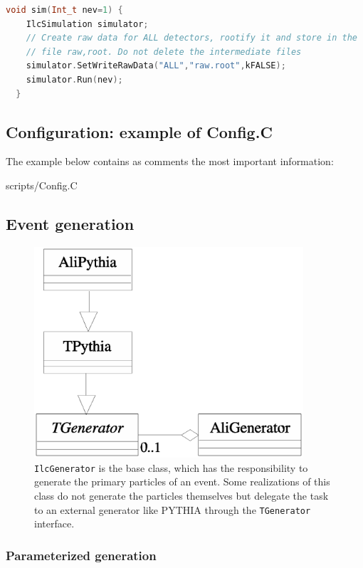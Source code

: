 \documentclass[12pt,a4paper,twoside]{article}
\begin{document}
\begin{lstlisting}[language=C++]
  void sim(Int_t nev=1) {
    IlcSimulation simulator;
    // Create raw data for ALL detectors, rootify it and store in the
    // file raw,root. Do not delete the intermediate files
    simulator.SetWriteRawData("ALL","raw.root",kFALSE);
    simulator.Run(nev);
  }
\end{lstlisting}


\subsection{Configuration: example of Config.C}

The example below contains as comments the most important information:

 {scripts/Config.C}


\subsection{Event generation}
\label{MC:Generators}
\begin{figure}[ht]
  \centering
  \includegraphics[width=10cm]{picts/ilcgen}
  \caption{\texttt{IlcGenerator} is the base class, which has the
    responsibility to generate the primary particles of an event. Some
    realizations of this class do not generate the particles themselves
    but delegate the task to an external generator like PYTHIA through the
    \texttt{TGenerator} interface.  }
  \label{MC:ilcgen}
\end{figure}

\subsubsection{Parameterized generation}
\end{document}
